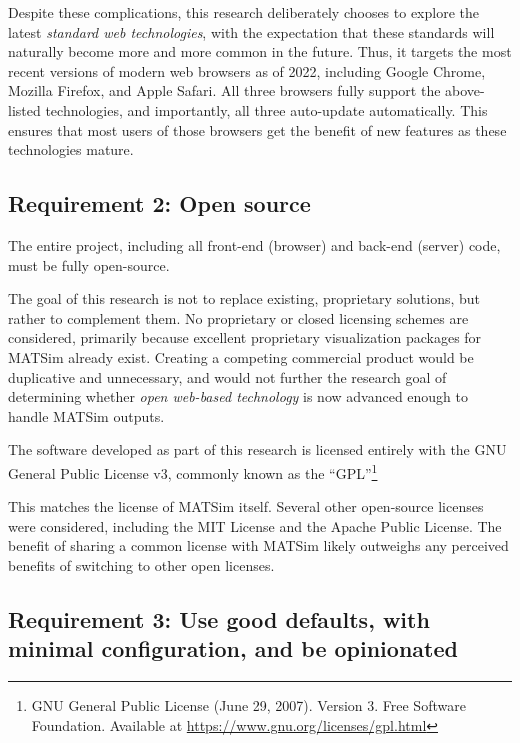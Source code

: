 Despite these complications, this research deliberately chooses to explore the latest \emph{standard web technologies}, with the expectation that these standards will naturally become more and more common in the future. Thus, it targets the most recent versions of modern web browsers as of 2022, including Google Chrome, Mozilla Firefox, and Apple Safari. All three browsers fully support the above-listed technologies, and importantly, all three auto-update automatically. This ensures that most users of those browsers get the benefit of new features as these technologies mature.

\hypertarget{requirement-2-open-source}{%
\subsection{Requirement 2: Open
source}\label{requirement-2-open-source}}

The entire project, including all front-end (browser) and back-end (server) code, must be fully open-source.

The goal of this research is not to replace existing, proprietary solutions, but rather to complement them. No proprietary or closed licensing schemes are considered, primarily because excellent proprietary visualization packages for MATSim already exist. Creating a competing commercial product would be duplicative and unnecessary, and would not further the research goal of determining whether \emph{open web-based technology} is now advanced enough to handle MATSim outputs.

The software developed as part of this research is licensed entirely with the GNU General Public License v3, commonly known as the ``GPL''\footnote{GNU General Public License (June 29, 2007). Version 3. Free Software Foundation. Available at \url{https://www.gnu.org/licenses/gpl.html}}

This matches the license of MATSim itself. Several other open-source licenses were considered, including the MIT License and the Apache Public License. The benefit of sharing a common license with MATSim likely outweighs any perceived benefits of switching to other open licenses.

\hypertarget{requirement-3-use-good-defaults-with-minimal-configuration-and-be-opinionated}{%
\subsection{Requirement 3: Use good defaults, with minimal configuration, and be opinionated}\label{requirement-3-use-good-defaults-with-minimal-configuration-and-be-opinionated}}

